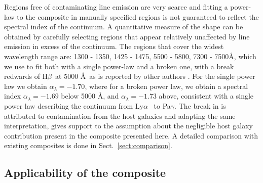 \documentclass{aa}    %
\newcommand{\sectionname}{Sect.}
\newcommand{\Sect}[1]{\sectionname~\ref{sect:#1}}
\newcommand{\sect}[1]{\Sect{#1}}
\newcommand{\sectlabel}[1]{\label{sect:#1}}
\newcommand{\lya}{Ly$\alpha$}
\newcommand{\hb}{H$\beta$}
\begin{document}
Regions free of contaminating line emission are very scarce and fitting a
power-law to the composite in manually specified regions is not guaranteed to
reflect the spectral index of the continuum. A quantitative measure of the shape
can be obtained by carefully selecting regions that appear relatively unaffected
by line emission in excess of the continuum. The regions that cover the widest
wavelength range are: 1300 - 1350, 1425 - 1475, 5500 - 5800, 7300 - 7500\AA,
which we use to fit both with a single power-law and a broken one, with a
break redwards of \hb~at 5000 \AA~as is reported by other authors
\citep[e.g.,][]{VandenBerk2001}. For the single power law we obtain
$\alpha_\lambda = -1.70$, where for a broken power law, we obtain a spectral
index $\alpha_\lambda = -1.69$ below 5000 \AA, and $\alpha_\lambda = -1.73$
above, consistent with a single power law describing the continuum from \lya
~to Pa$\gamma$. The break in \cite{VandenBerk2001} is attributed to
contamination from the host galaxies \citep{Glikman2006} and adapting the same
interpretation, gives support to the assumption about the negligible host galaxy
contribution present in the composite presented here. A detailed comparison with
existing composites is done in \sect{comparison}.


\subsection{Applicability of the composite}  \sectlabel{application}
\end{document}
